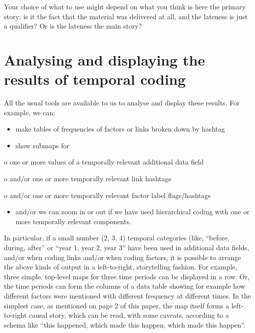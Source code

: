 \documentclass[
]{book}
\providecommand{\tightlist}{%
  \setlength{\itemsep}{0pt}\setlength{\parskip}{0pt}}
\begin{document}
Your choice of what to use might depend on what you think is here the primary story: is it the fact that the material was delivered at all, and the lateness is just a qualifier? Or is the lateness the main story?

\hypertarget{analysing-and-displaying-the-results-of-temporal-coding}{%
\section{Analysing and displaying the results of temporal coding}\label{analysing-and-displaying-the-results-of-temporal-coding}}

All the usual tools are available to us to analyse and display these results. For example, we can:

\begin{itemize}
\item
  make tables of frequencies of factors or links broken down by hashtag
\item
  show submaps for
\end{itemize}

o one or more values of a temporally relevant additional data field

o and/or one or more temporally relevant link hashtags

o and/or one or more temporally relevant factor label flags/hashtags

\begin{itemize}
\tightlist
\item
  and/or we can zoom in or out if we have used hierarchical coding with one or more temporally relevant components.
\end{itemize}

In particular, if a small number (2, 3, 4) temporal categories (like, ``before, during, after'' or ``year 1, year 2, year 3'' have been used in additional data fields, and/or when coding links and/or when coding factors, it is possible to arrange the above kinds of output in a left-to-right, storytelling fashion. For example, three simple, top-level maps for three time periods can be displayed in a row. Or, the time periods can form the columns of a data table showing for example how different factors were mentioned with different frequency at different times. In the simplest case, as mentioned on page 2 of this paper, the map itself forms a left-to-right causal story, which can be read, with some caveats, according to a schema like ``this happened, which made this happen, which made this happen''.
\end{document}
